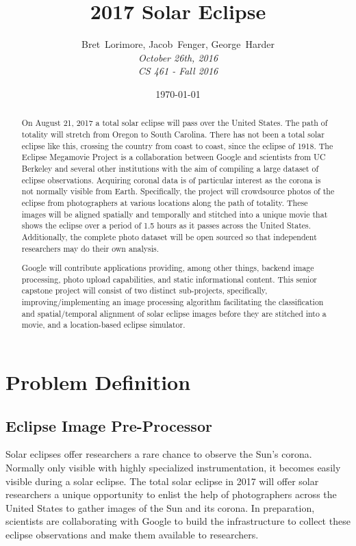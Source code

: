 \documentclass[10pt, onecolumn, draftclsnofoot, letterpaper]{IEEEtran}
\title{2017 Solar Eclipse}
\date{\today} %
\author{Bret~Lorimore, Jacob~Fenger, George~Harder \\
		\textit{October 26th, 2016 \\
		CS 461 - Fall 2016}}
\begin{document}
\maketitle

\begin{abstract}

On August 21, 2017 a total solar eclipse will pass over the United States. The
path of totality will stretch from Oregon to South Carolina. There has not been
a total solar eclipse like this, crossing the country from coast to coast, since
the eclipse of 1918. The Eclipse Megamovie Project is a collaboration between
Google and scientists from UC Berkeley and several other institutions with the
aim of compiling a large dataset of eclipse observations. Acquiring coronal data
is of particular interest as the corona is not normally visible from Earth.
Specifically, the project will crowdsource photos of the eclipse from
photographers at various locations along the path of totality. These images will
be aligned spatially and temporally and stitched into a unique movie that shows
the eclipse over a period of 1.5 hours as it passes across the United States.
Additionally, the complete photo dataset will be open sourced so that
independent researchers may do their own analysis.

Google will contribute applications providing, among other things, backend image
processing, photo upload capabilities, and static informational content. This
senior capstone project will consist of two distinct sub-projects, specifically,
improving/implementing an image processing algorithm facilitating the
classification and spatial/temporal alignment of solar eclipse images before
they are stitched into a movie, and a location-based eclipse simulator.

\end{abstract}

\newpage %

\section{Problem Definition}

\subsection{Eclipse Image Pre-Processor}

Solar eclipses offer researchers a rare chance to observe the Sun's corona.
Normally only visible with highly specialized instrumentation, it becomes easily
visible during a solar eclipse. The total solar eclipse in 2017 will offer solar
researchers a unique opportunity to enlist the help of photographers across the
United States to gather images of the Sun and its corona. In preparation,
scientists are collaborating with Google to build the infrastructure to collect
these eclipse observations and make them available to researchers.
\end{document}
